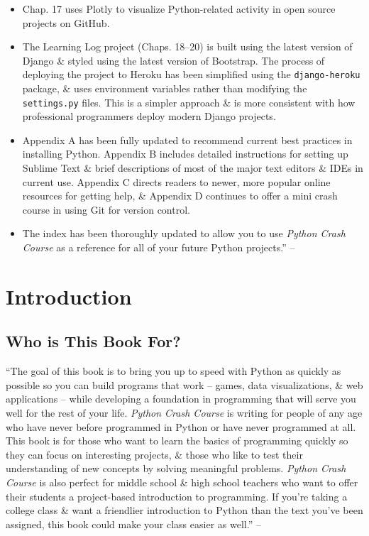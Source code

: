 \documentclass[oneside]{book}
\numberwithin{equation}{section}
\begin{document}
\begin{itemize}
	\item Chap. 17 uses Plotly to visualize Python-related activity in open source projects on GitHub.
	\item The Learning Log project (Chaps. 18--20) is built using the latest version of Django \& styled using the latest version of Bootstrap. The process of deploying the project to Heroku has been simplified using the \texttt{django-heroku} package, \& uses environment variables rather than modifying the \texttt{settings.py} files. This is a simpler approach \& is more consistent with how professional programmers deploy modern Django projects.
	\item Appendix A has been fully updated to recommend current best practices in installing Python. Appendix B includes detailed instructions for setting up Sublime Text \& brief descriptions of most of the major text editors \& IDEs in current use. Appendix C directs readers to newer, more popular online resources for getting help, \& Appendix D continues to offer a mini crash course in using Git for version control.
	\item The index has been thoroughly updated to allow you to use \textit{Python Crash Course} as a reference for all of your future Python projects.'' -- \cite[Preface to the 2nd Edition, pp. xxvii--xxix]{Matthes2019}
\end{itemize}


\section*{Introduction}

\subsection*{Who is This Book For?}
``The goal of this book is to bring you up to speed with Python as quickly as possible so you can build programs that work -- games, data visualizations, \& web applications -- while developing a foundation in programming that will serve you well for the rest of your life. \textit{Python Crash Course} is writing for people of any age who have never before programmed in Python or have never programmed at all. This book is for those who want to learn the basics of programming quickly so they can focus on interesting projects, \& those who like to test their understanding of new concepts by solving meaningful problems. \textit{Python Crash Course} is also perfect for middle school \& high school teachers who want to offer their students a project-based introduction to programming. If you're taking a college class \& want a friendlier introduction to Python than the text you've been assigned, this book could make your class easier as well.'' -- \cite[Introduction, p. xxxiv]{Matthes2019}
\end{document}
